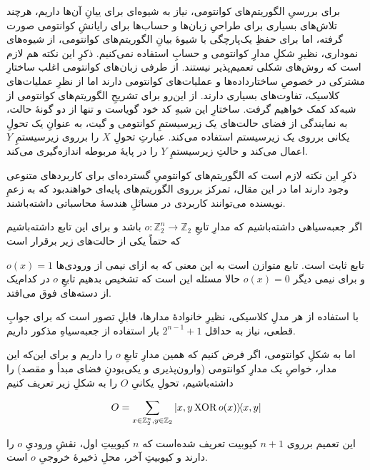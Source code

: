 برای بررسیِ الگوریتم‌های کوانتومی، نیاز به شیوه‌ای برای ییانِ آن‌ها داریم، هرچند تلاش‌های بسیاری برای طراحیِ زبان‌ها و حساب‌ها برای رایانشِ کوانتومی صورت گرفته، اما برای حفظِ یک‌پارچگی با شیوهٔ بیانِ الگوریتم‌های کوانتومی، از شیوه‌های نموداری، نظیرِ شکلِ مدارِ کوانتومی و حسابِ 
استفاده نمی‌کنیم.
ذکرِ این نکته هم لازم است که روش‌های شکلی تعمیم‌پذیر نیستند. از طرفی زبان‌های کوانتومی اغلب ساختارِ مشترکی در خصوصِ ساختارداده‌ها و عملیات‌های کوانتومی دارند اما از نظرِ عملیات‌های کلاسیک، تفاوت‌های بسیاری دارند. از این‌رو برای تشریحِ الگوریتم‌های کوانتومی از شبه‌کد کمک خواهیم گرفت. ساختارِ این شبهِ کد خود گویاست و تنها از دو گونهٔ حالت، به نمایندگی از فضای حالت‌های یک زیرسیستمِ کوانتومی و گیت، به عنوانِ یک تحولِ یکانی برروی یک زیرسیستم استفاده می‌کند. عبارتِ 
تحولِ $X$ را برروی زیرسیستمِ $Y$ اعمال می‌کند و 
حالتِ زیرسیستمِ $Y$ را در پایهٔ مربوطه اندازه‌گیری می‌کند.


ذکرِ این نکته لازم است که الگوریتم‌های کوانتومیِ گسترده‌ای برای کاربردهای متنوعی وجود دارند
 اما در این مقال، تمرکز برروی الگوریتم‌های پایه‌ای خواهندبود که به زعمِ نویسنده می‌توانند کاربردی در مسائلِ هندسهٔ محاسباتی داشته‌باشند.



اگر جعبه‌سیاهی داشته‌باشیم که مدارِ تابعِ 
\( o : \mathbb{Z}_2^n \to \mathbb{Z}_2 \)
باشد و برای این تابع داشته‌باشیم که حتماً یکی از حالت‌های زیر برقرار است

 تابع ثابت است.
 تابع متوازن است به این معنی که به ازای نیمی از ورودی‌ها 
\( o(x) = 1 \)
و برای نیمی دیگر
\( o(x) = 0 \)
حالا مسئله این است که تشخیص بدهیم تابعِ \(o\) در کدام‌یک از دسته‌های فوق می‌افتد.

با استفاده از هر مدلِ  کلاسیکی، نظیرِ خانوادهٔ مدارها، قابلِ تصور است که برای جوابِ قطعی، نیاز به حداقل
\(2^{n-1}+1\)
بار استفاده از جعبه‌سیاهِ مذکور داریم.

اما به شکلِ کوانتومی، اگر فرض کنیم که همین مدارِ تابعِ \(o\) را داریم و برای این‌که این مدار، خواصِ یک مدارِ کوانتومی (وارون‌پذیری و یکی‌بودنِ فضای مبدأ و مقصد) را داشته‌باشیم، تحولِ یکانیِ \(O\) را به شکلِ زیر تعریف کنیم

\begin{equation}
    O = \sum_{x \in \mathbb{Z}_2^n, y \in \mathbb{Z}_2} \dyad{x, y \XOR o(x)}{x, y}
\end{equation} 

این تعمیم برروی \(n+1\) کیوبیت تعریف شده‌است که \(n\) کیوبیتِ اول، نقشِ ورودیِ \(o\) را دارند و کیوبیتِ آخر، محلِ ذخیرهٔ خروجیِ \(o\) است.

